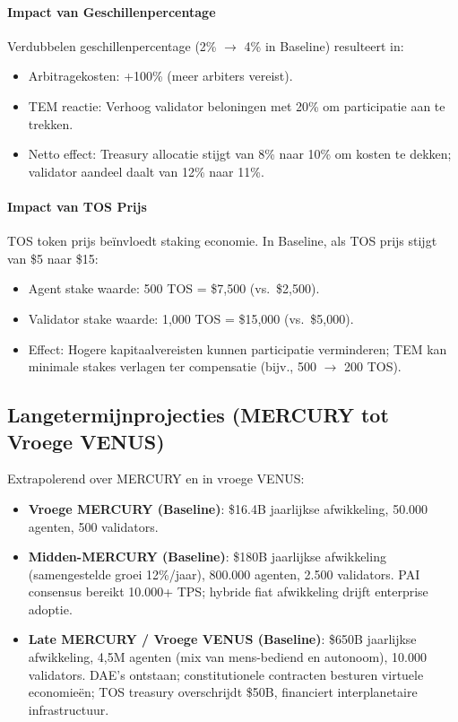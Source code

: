 \documentclass[11pt]{article}
\begin{document}
\paragraph{Impact van Geschillenpercentage}
Verdubbelen geschillenpercentage (2\% $\to$ 4\% in Baseline) resulteert in:
\begin{itemize}[noitemsep]
  \item Arbitragekosten: +100\% (meer arbiters vereist).
  \item TEM reactie: Verhoog validator beloningen met 20\% om participatie aan te trekken.
  \item Netto effect: Treasury allocatie stijgt van 8\% naar 10\% om kosten te dekken; validator aandeel daalt van 12\% naar 11\%.
\end{itemize}

\paragraph{Impact van TOS Prijs}
TOS token prijs beïnvloedt staking economie. In Baseline, als TOS prijs stijgt van \$5 naar \$15:
\begin{itemize}[noitemsep]
  \item Agent stake waarde: 500 TOS = \$7{,}500 (vs.\ \$2{,}500).
  \item Validator stake waarde: 1,000 TOS = \$15{,}000 (vs.\ \$5{,}000).
  \item Effect: Hogere kapitaalvereisten kunnen participatie verminderen; TEM kan minimale stakes verlagen ter compensatie (bijv., 500 $\to$ 200 TOS).
\end{itemize}

\subsection{Langetermijnprojecties (MERCURY tot Vroege VENUS)}
Extrapolerend over MERCURY en in vroege VENUS:
\begin{itemize}[noitemsep]
  \item \textbf{Vroege MERCURY (Baseline)}: \$16.4B jaarlijkse afwikkeling, 50.000 agenten, 500 validators.
  \item \textbf{Midden-MERCURY (Baseline)}: \$180B jaarlijkse afwikkeling (samengestelde groei 12\%/jaar), 800.000 agenten, 2.500 validators. PAI consensus bereikt 10.000+ TPS; hybride fiat afwikkeling drijft enterprise adoptie.
  \item \textbf{Late MERCURY / Vroege VENUS (Baseline)}: \$650B jaarlijkse afwikkeling, 4,5M agenten (mix van mens-bediend en autonoom), 10.000 validators. DAE's ontstaan; constitutionele contracten besturen virtuele economieën; TOS treasury overschrijdt \$50B, financiert interplanetaire infrastructuur.
\end{itemize}
\end{document}
